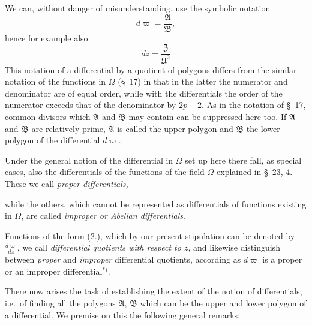 \documentclass{article}
\begin{document}
We can, without danger of misunderstanding, use the symbolic notation
\[ d\varpi = \frac{\mathfrak{A}}{\mathfrak{B}}, \]
hence for example also
\[ dz = \frac{\mathfrak{Z}}{\mathfrak{U}^{2}} \]
This notation of a differential by a quotient of polygons differs from the similar notation of the functions in $\Omega$ (§~17) in that in the latter the numerator and denominator are of equal order, while with the differentials the order of the numerator exceeds that of the denominator by $2p-2$. As in the notation of §~17, common divisors which $\mathfrak{A}$ and $\mathfrak{B}$ may contain can be suppressed here too. If $\mathfrak{A}$ and $\mathfrak{B}$ are relatively prime, $\mathfrak{A}$ is called the upper polygon and $\mathfrak{B}$ the lower polygon of the differential $d\varpi$.

Under the general notion of the differential in $\Omega$ set up here there fall, as special cases, also the differentials of the functions of the field $\Omega$ explained in §~23, 4. These we call \emph{proper differentials,}

while the others, which cannot be represented as differentials of functions existing in $\Omega$, are called \emph{improper or Abelian differentials}.

Functions of the form (2.), which by our present stipulation can be denoted by $\frac{d\varpi}{dz}$, we call \emph{differential quotients with respect to $z$}, and likewise distinguish between \emph{proper} and \emph{improper} differential quotients, according as $d\varpi$ is a proper or an improper differential${}^{*)}$.

There now arises the task of establishing the extent of the notion of differentials, i.e.\ of finding all the polygons $\mathfrak{A}$, $\mathfrak{B}$ which can be the upper and lower polygon of a differential. We premise on this the following general remarks:
\end{document}
